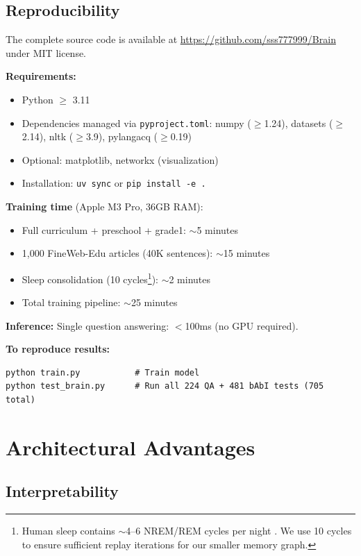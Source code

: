 \documentclass[11pt]{article}
\begin{document}
\subsection{Reproducibility}

The complete source code is available at \url{https://github.com/sss777999/Brain} under MIT license.

\textbf{Requirements:}
\begin{itemize}
\item Python $\geq$ 3.11
\item Dependencies managed via \texttt{pyproject.toml}: numpy ($\geq$1.24), datasets ($\geq$2.14), nltk ($\geq$3.9), pylangacq ($\geq$0.19)
\item Optional: matplotlib, networkx (visualization)
\item Installation: \texttt{uv sync} or \texttt{pip install -e .}
\end{itemize}

\textbf{Training time} (Apple M3 Pro, 36GB RAM):
\begin{itemize}
\item Full curriculum + preschool + grade1: $\sim$5 minutes
\item 1,000 FineWeb-Edu articles (40K sentences): $\sim$15 minutes
\item Sleep consolidation (10 cycles\footnote{Human sleep contains $\sim$4--6 NREM/REM cycles per night \citep{diekelmann2010memory}. We use 10 cycles to ensure sufficient replay iterations for our smaller memory graph.}): $\sim$2 minutes
\item Total training pipeline: $\sim$25 minutes
\end{itemize}

\textbf{Inference:} Single question answering: $<$100ms (no GPU required).

\textbf{To reproduce results:}
\begin{verbatim}
python train.py           # Train model
python test_brain.py      # Run all 224 QA + 481 bAbI tests (705 total)
\end{verbatim}

\section{Architectural Advantages}

\subsection{Interpretability}
\end{document}
